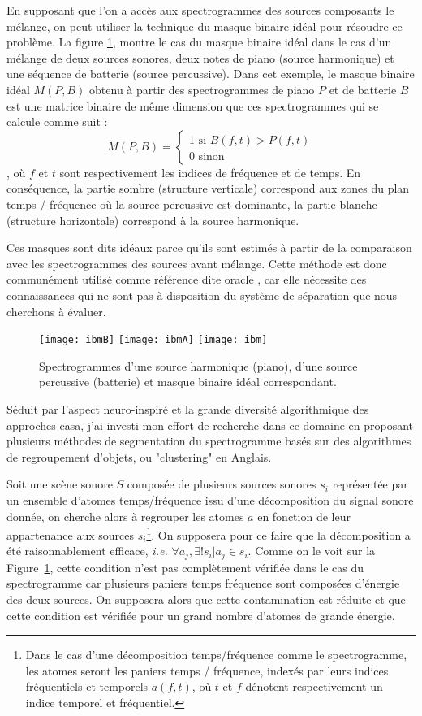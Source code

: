 En supposant que l'on a accès aux spectrogrammes des sources composants le mélange, on peut utiliser la technique du masque binaire idéal pour résoudre ce problème. La figure \ref{fig:ibm}, montre le cas du masque binaire idéal dans le cas d'un mélange de deux sources sonores, deux notes de piano (source harmonique) et une séquence de batterie (source percussive). Dans cet exemple, le masque binaire idéal $M(P, B)$ obtenu à partir des spectrogrammes de piano $P$ et de batterie $B$  est une matrice binaire de même dimension que ces spectrogrammes qui se calcule comme suit :
\begin{equation}
M(P, B) =
\begin{cases}
  1 \text{ si } B(f,t)>P(f,t) \\
  0 \text{ sinon}
\end{cases}
\end{equation},
où $f$ et $t$ sont respectivement les indices de fréquence et de temps. En conséquence, la partie sombre (structure verticale) correspond aux zones du plan temps / fréquence où la source percussive est dominante, la partie blanche (structure horizontale) correspond à la source harmonique.

Ces masques sont dits idéaux parce qu'ils sont estimés à partir de la comparaison avec les spectrogrammes des sources avant mélange. Cette méthode est donc communément utilisé comme référence dite \og oracle \fg, car elle nécessite des connaissances qui ne sont pas à disposition du système de séparation que nous cherchons à évaluer.

\begin{figure}[t]
  \texttt{[image: ibmB]}
  \texttt{[image: ibmA]}
  \texttt{[image: ibm]}
  \caption{Spectrogrammes d'une source harmonique (piano), d'une source percussive (batterie) et masque binaire idéal correspondant.} \label{fig:ibm}
\end{figure}


Séduit par l'aspect neuro-inspiré et la grande diversité algorithmique des approches casa, j'ai investi mon effort de recherche dans ce domaine en proposant plusieurs méthodes de segmentation du spectrogramme basés sur des algorithmes de regroupement d'objets, ou "clustering" en Anglais.

Soit une scène sonore $S$ composée de plusieurs sources sonores $s_i$ représentée par un ensemble d'atomes temps/fréquence issu d'une décomposition du signal sonore donnée, on cherche alors à regrouper les atomes $a$ en fonction de leur appartenance aux sources $s_i$\footnote{Dans le cas d'une décomposition temps/fréquence comme le spectrogramme, les atomes seront les paniers temps / fréquence, indexés par leurs indices fréquentiels et temporels $a(f, t)$, où $t$ et $f$ dénotent respectivement un indice temporel et fréquentiel.}. On supposera pour ce faire que la décomposition a été raisonnablement efficace, \textit{i.e.} $\forall a_j, \exists ! s_i | a_j \in s_i$. Comme on le voit sur la Figure~\ref{fig:ibm}, cette condition n'est pas complètement vérifiée dans le cas du spectrogramme car plusieurs paniers temps fréquence sont composées d'énergie des deux sources. On supposera alors que cette contamination est réduite et que cette condition est vérifiée pour un grand nombre d'atomes de grande énergie.

